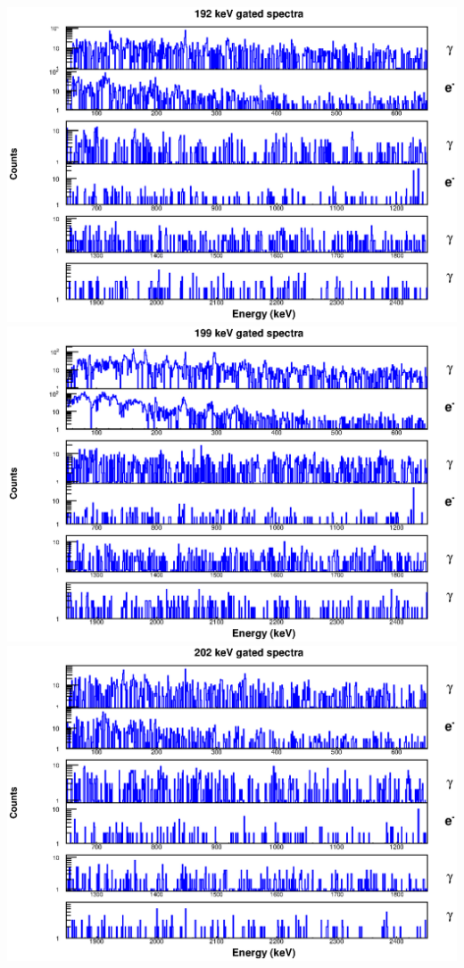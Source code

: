 \includegraphics[scale=0.8]{154Gd_Appendix/192_combined.eps}
\includegraphics[scale=0.8]{154Gd_Appendix/199_combined.eps}
\includegraphics[scale=0.8]{154Gd_Appendix/202_combined.eps}
